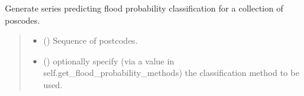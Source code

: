 \documentclass[letterpaper,10pt,english]{sphinxmanual}
\begin{document}
\begin{fulllineitems}
\begin{fulllineitems}
\begin{sphinxVerbatim}[commandchars=\\\{\}]
\PYG{p}{[} \PYG{p}{]}
\end{sphinxVerbatim}

\begin{sphinxVerbatim}[commandchars=\\\{\}]
\PYG{p}{[}\PYG{p}{]}
\end{sphinxVerbatim}

\end{fulllineitems}


\begin{fulllineitems}
\label{\detokenize{index:flood_tool.Tool.get_flood_class}}
\pysigstartsignatures
{}
\pysigstopsignatures
\sphinxAtStartPar
Generate series predicting flood probability classification
for a collection of poscodes.
\begin{quote}\begin{description}
\begin{itemize}
\item {} 
\sphinxAtStartPar
{} () \textendash{} Sequence of postcodes.

\item {} 
\sphinxAtStartPar
{} (\sphinxstyleliteralemphasis{\sphinxupquote{ (}}\sphinxstyleliteralemphasis{\sphinxupquote{)}}) \textendash{} optionally specify (via a value in
self.get\_flood\_probability\_methods) the classification
method to be used.


\end{itemize}
\end{description}
\end{quote}
\end{fulllineitems}
\end{fulllineitems}
\end{document}
